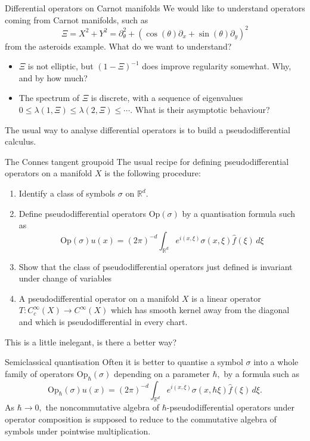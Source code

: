 \documentclass{beamer}
\numberwithin{equation}{section}
\theoremstyle{plain}
\theoremstyle{plain}
\theoremstyle{definition}
\theoremstyle{plain}
\theoremstyle{plain}
\theoremstyle{definition}
\newcommand{\Rl}{\mathbb{R}}
\newcommand{\Op}{\mathrm{Op}}
\begin{document}
\begin{frame}{Differential operators on Carnot manifolds}
  We would like to understand operators coming from Carnot manifolds, such as
  \[
    \Xi = X^2+Y^2 = \partial_\theta^2+(\cos(\theta)\partial_x+\sin(\theta)\partial_y)^2
  \]
  from the asteroids example. What do we want to understand?
  \begin{itemize}
    \item{} $\Xi$ is not elliptic, but $(1-\Xi)^{-1}$ does improve regularity somewhat. Why, and by how much?
    \item{} The spectrum of $\Xi$ is discrete, with a sequence of eigenvalues $0\leq \lambda(1,\Xi) \leq \lambda(2,\Xi) \leq \cdots.$ What is their asymptotic behaviour?
  \end{itemize}
  The usual way to analyse differential operators is to build a pseudodifferential calculus.
\end{frame}

\begin{frame}{The Connes tangent groupoid}
  The usual recipe for defining pseudodifferential operators on a manifold $X$ is the following procedure:
  \begin{enumerate}
      \item{} Identify a class of symbols $\sigma$ on $\Rl^d.$
      \item{} Define pseudodifferential operators $\Op(\sigma)$ by a quantisation formula such as
      \[
        \Op(\sigma)u(x) = (2\pi)^{-d} \int_{\Rl^d} e^{i(x,\xi)} \sigma(x,\xi)\widehat{f}(\xi)\,d\xi
      \]
      \item{} Show that the class of pseudodifferential operators just defined is invariant under change of variables
      \item{} A pseudodifferential operator on a manifold $X$ is a linear operator $T:C^\infty_c(X)\to C^\infty(X)$ which has smooth kernel away from the diagonal and which is pseudodifferential in every chart.
  \end{enumerate}
  This is a little inelegant, is there a better way?
\end{frame}

\begin{frame}{Semiclassical quantisation}
  Often it is better to quantise a symbol $\sigma$ into a whole family of operators $\Op_{\hbar}(\sigma)$ depending on a parameter $\hbar,$ by a formula such as
  \[
    \Op_{\hbar}(\sigma)u(x) = (2\pi)^{-d} \int_{\Rl^d} e^{i(x,\xi)}\sigma(x,\hbar \xi)\widehat{f}(\xi)\,d\xi.
  \]
  As $\hbar\to 0,$ the noncommutative algebra of $\hbar$-pseudodifferential operators under operator composition is supposed to reduce to the commutative algebra of symbols under pointwise multiplication.
\end{frame}
\end{document}
